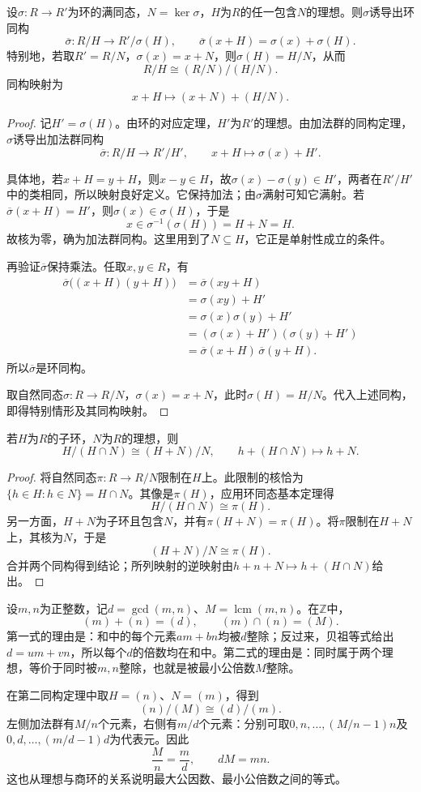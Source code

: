 \begin{theorem}\label{p2:ring-third-iso}
设$\sigma:R\to R'$为环的满同态，$N=\ker\sigma$，$H$为$R$的任一包含$N$的理想。则$\sigma$诱导出环同构
\[
\overline\sigma:R/H\longrightarrow R'/\sigma(H),
\qquad
\overline\sigma(x+H)=\sigma(x)+\sigma(H).
\]
特别地，若取$R'=R/N$，$\sigma(x)=x+N$，则$\sigma(H)=H/N$，从而
\[
R/H\cong(R/N)/(H/N).
\]
同构映射为
\[
x+H\longmapsto(x+N)+(H/N).
\]
\end{theorem}
\begin{proof}
记$H'=\sigma(H)$。由环的对应定理，$H'$为$R'$的理想。由加法群的同构定理，$\sigma$诱导出加法群同构
\[
\overline\sigma:R/H\longrightarrow R'/H',
\qquad x+H\longmapsto\sigma(x)+H'.
\]

具体地，若$x+H=y+H$，则$x-y\in H$，故$\sigma(x)-\sigma(y)\in H'$，两者在$R'/H'$中的类相同，所以映射良好定义。它保持加法；由$\sigma$满射可知它满射。若$\overline\sigma(x+H)=H'$，则$\sigma(x)\in\sigma(H)$，于是
\[
x\in\sigma^{-1}(\sigma(H))=H+N=H.
\]
故核为零，确为加法群同构。这里用到了$N\subseteq H$，它正是单射性成立的条件。

再验证$\overline\sigma$保持乘法。任取$x,y\in R$，有
\begin{align*}
\overline\sigma\bigl((x+H)(y+H)\bigr)
&=\overline\sigma(xy+H)\\
&=\sigma(xy)+H'\\
&=\sigma(x)\sigma(y)+H'\\
&=(\sigma(x)+H')(\sigma(y)+H')\\
&=\overline\sigma(x+H)\,\overline\sigma(y+H).
\end{align*}
所以$\overline\sigma$是环同构。

取自然同态$\sigma:R\to R/N$，$\sigma(x)=x+N$，此时$\sigma(H)=H/N$。代入上述同构，即得特别情形及其同构映射。
\end{proof}

\begin{theorem}\label{p2:ring-second-iso}
若$H$为$R$的子环，$N$为$R$的理想，则
\[
H/(H\cap N)\cong(H+N)/N,\qquad
h+(H\cap N)\longmapsto h+N.
\]
\end{theorem}
\begin{proof}
将自然同态$\pi:R\to R/N$限制在$H$上。此限制的核恰为$\{h\in H:h\in N\}=H\cap N$。其像是$\pi(H)$，应用环同态基本定理得
\[
H/(H\cap N)\cong\pi(H).
\]
另一方面，$H+N$为子环且包含$N$，并有$\pi(H+N)=\pi(H)$。将$\pi$限制在$H+N$上，其核为$N$，于是
\[
(H+N)/N\cong\pi(H).
\]
合并两个同构得到结论；所列映射的逆映射由$h+n+N\mapsto h+(H\cap N)$给出。
\end{proof}

\begin{example}
设$m,n$为正整数，记$d=\gcd(m,n)$、$M=\operatorname{lcm}(m,n)$。在$\mathbb Z$中，
\[
(m)+(n)=(d),\qquad(m)\cap(n)=(M).
\]
第一式的理由是：和中的每个元素$am+bn$均被$d$整除；反过来，贝祖等式给出$d=um+vn$，所以每个$d$的倍数均在和中。第二式的理由是：同时属于两个理想，等价于同时被$m,n$整除，也就是被最小公倍数$M$整除。

在第二同构定理中取$H=(n)$、$N=(m)$，得到
\[
(n)/(M)\cong(d)/(m).
\]
左侧加法群有$M/n$个元素，右侧有$m/d$个元素：分别可取$0,n,\ldots,(M/n-1)n$及$0,d,\ldots,(m/d-1)d$为代表元。因此
\[
\frac Mn=\frac md,\qquad dM=mn.
\]
这也从理想与商环的关系说明最大公因数、最小公倍数之间的等式。
\end{example}
